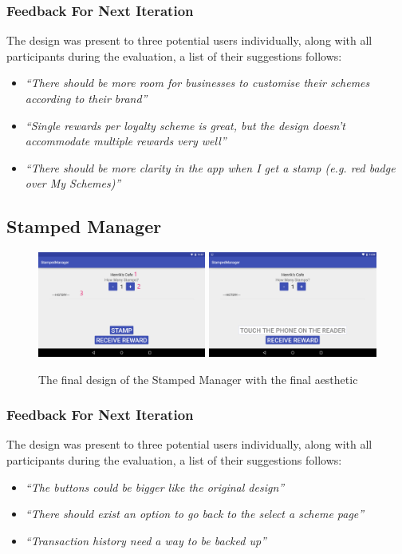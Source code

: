 \subsubsection{Feedback For Next Iteration}
The design was present to three potential users individually, along with all participants during the evaluation, a list of their suggestions follows:
\begin{itemize}
  \item \textit{``There should be more room for businesses to customise their schemes according to their brand''}
  \item \textit{``Single rewards per loyalty scheme is great, but the design doesn't accommodate multiple rewards very well''}
  \item \textit{``There should be more clarity in the app when I get a stamp (e.g. red badge over My Schemes)''}
\end{itemize}

\subsection{Stamped Manager}
\begin{figure}[H]
 \centering
  \includegraphics[width=0.494\textwidth]{img/readerfinalmock2.png}
   \includegraphics[width=0.494\textwidth]{img/readerfinalmock1.png}
     \caption{The final design of the Stamped Manager with the final aesthetic}
     \label{fig:wireframemr2}
\end{figure}

\subsubsection{Feedback For Next Iteration}
The design was present to three potential users individually, along with all participants during the evaluation, a list of their suggestions follows:
\begin{itemize}
  \item \textit{``The buttons could be bigger like the original design''}
  \item \textit{``There should exist an option to go back to the select a scheme page''}
  \item \textit{``Transaction history need a way to be backed up''}
\end{itemize}


